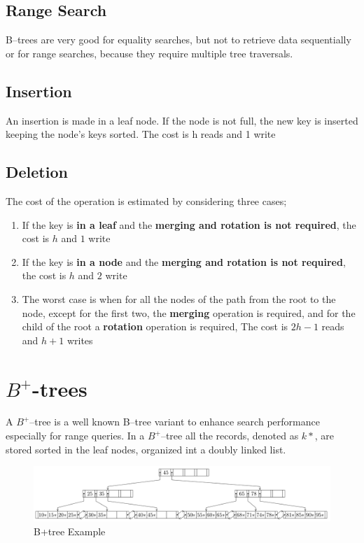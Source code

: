 \subsection{Range Search}
B–trees are very good for equality searches, but not to retrieve data sequentially or for range searches, because they require multiple tree traversals.

\subsection{Insertion}
An insertion is made in a leaf node. If the node is not full, the new key is inserted keeping the node’s keys sorted. The cost is h reads and 1 write

\subsection{Deletion}
The cost of the operation is estimated by considering three cases;
\begin{enumerate}
    \item If the key is \textbf{in a leaf} and the \textbf{merging and rotation is not required}, the cost is \(h\) and \(1\) write
    \item If the key is \textbf{in a node} and the \textbf{merging and rotation is not required}, the cost is \(h\) and \(2\) write
    \item The worst case is when for all the nodes of the path from the root to the node, except for the first two, the \textbf{merging} operation is required, and for the child of the root a \textbf{rotation} operation is required, The cost is \(2h - 1\) reads and \(h + 1\) writes
\end{enumerate}


\section{\(B^{+}\)-trees}
A \(B^+\)–tree is a well known B–tree variant to enhance search performance especially for range queries. In a \(B^+\)–tree all the records, denoted as \(k*\), are stored sorted in the leaf nodes, organized int a doubly linked list.

\begin{figure}[!h]
    \centering
    \includegraphics[width=0.99\linewidth]{images/DBMS_Internals/DynamicTreeStructureOrganizations/b+tree.jpeg}
    \caption{B+tree Example}
\end{figure}

